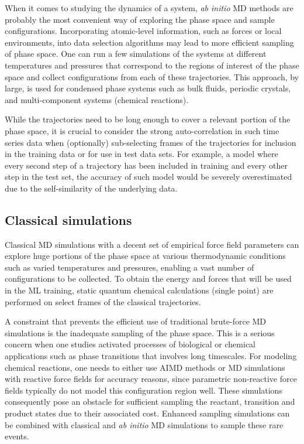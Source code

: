 \documentclass[9pt,bestpractices]{livecoms}
\begin{document}
When it comes to studying the dynamics of a system, {\em ab initio} MD methods
are probably the most convenient way of exploring the phase space and sample
configurations. Incorporating atomic-level information, such as forces or local environments, into data selection algorithms may lead to more efficient sampling of phase space. One can run a few simulations of the systems at different
temperatures and pressures that correspond to the regions of interest of the phase space and
collect configurations from each of these trajectories. This approach, by large,
is used for condensed phase systems such as bulk fluids, periodic crystals, and
multi-component systems (chemical reactions).

While the trajectories need to be long enough to cover a relevant portion of the phase space, it is crucial to consider the strong auto-correlation in such time series data when (optionally) sub-selecting frames of the trajectories for inclusion in the training data or for use in test data sets. For example, a model where every second step of a trajectory has been included in training and every other step in the test set, the accuracy of such model would be severely overestimated due to the self-similarity of the underlying data.

\subsection{Classical simulations}
Classical MD simulations with a decent set of empirical force field parameters can
explore huge portions of the phase space at various thermodynamic conditions such as 
varied temperatures and pressures, enabling a vast number of configurations to be 
collected. 
To obtain the energy and forces that will be used in the ML training, 
static quantum chemical calculations (single point) are performed on select frames of the classical trajectories.

A constraint that prevents the efficient use of traditional brute-force 
MD simulations is the inadequate sampling of the phase space. This is a serious
concern when one studies activated processes of biological or chemical applications
such as phase transitions that involves long timescales. For modeling chemical
reactions, one needs to either use AIMD methods or MD simulations with reactive
force fields for accuracy reasons, since parametric non-reactive force fields typically do not model this configuration region well. These simulations consequently pose an obstacle for sufficient sampling the reactant, transition
and product states due to their associated cost. Enhanced sampling simulations can be combined
with classical and {\em ab initio} MD simulations to sample these rare events.
\end{document}
